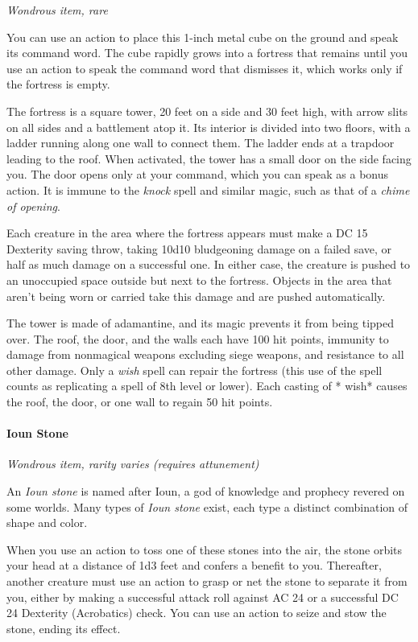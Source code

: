 \documentclass[
]{article}
\begin{document}
\emph{Wondrous item, rare}

You can use an action to place this 1-inch metal cube on the ground and
speak its command word. The cube rapidly grows into a fortress that
remains until you use an action to speak the command word that dismisses
it, which works only if the fortress is empty.

The fortress is a square tower, 20 feet on a side and 30 feet high, with
arrow slits on all sides and a battlement atop it. Its interior is
divided into two floors, with a ladder running along one wall to connect
them. The ladder ends at a trapdoor leading to the roof. When activated,
the tower has a small door on the side facing you. The door opens only
at your command, which you can speak as a bonus action. It is immune to
the \emph{knock} spell and similar magic, such as that of a \emph{chime
of opening}.

Each creature in the area where the fortress appears must make a DC 15
Dexterity saving throw, taking 10d10 bludgeoning damage on a failed
save, or half as much damage on a successful one. In either case, the
creature is pushed to an unoccupied space outside but next to the
fortress. Objects in the area that aren't being worn or carried take
this damage and are pushed automatically.

The tower is made of adamantine, and its magic prevents it from being
tipped over. The roof, the door, and the walls each have 100 hit points,
immunity to damage from nonmagical weapons excluding siege weapons, and
resistance to all other damage. Only a \emph{wish} spell can repair the
fortress (this use of the spell counts as replicating a spell of 8th
level or lower). Each casting of * wish* causes the roof, the door, or
one wall to regain 50 hit points.

\hypertarget{ioun-stone}{%
\paragraph{Ioun Stone}\label{ioun-stone}}

\emph{Wondrous item, rarity varies (requires attunement)}

An \emph{Ioun stone} is named after Ioun, a god of knowledge and
prophecy revered on some worlds. Many types of \emph{Ioun stone} exist,
each type a distinct combination of shape and color.

When you use an action to toss one of these stones into the air, the
stone orbits your head at a distance of 1d3 feet and confers a benefit
to you. Thereafter, another creature must use an action to grasp or net
the stone to separate it from you, either by making a successful attack
roll against AC 24 or a successful DC 24 Dexterity (Acrobatics) check.
You can use an action to seize and stow the stone, ending its effect.
\end{document}
